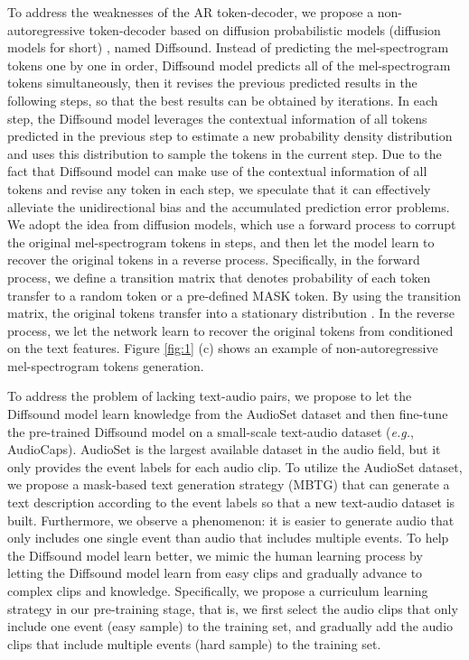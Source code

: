 \documentclass[lettersize,journal]{IEEEtran}
\begin{document}
To address the weaknesses of the AR token-decoder, we propose a non-autoregressive token-decoder based on diffusion probabilistic models (diffusion models for short) \cite{ho2020denoising,sohl2015deep,austin2021structured,gu2021vector}, named Diffsound. Instead of predicting the mel-spectrogram tokens one by one in order, Diffsound model predicts all of the mel-spectrogram tokens simultaneously, then it revises the previous predicted results in the following steps, so that the best results can be obtained by iterations. In each step, the Diffsound model leverages the contextual information of all tokens predicted in the previous step to estimate a new probability density distribution and uses this distribution to sample the tokens in the current step. Due to the fact that Diffsound model can make use of the contextual information of all tokens and revise any token in each step, we speculate that it can effectively alleviate  the unidirectional bias and the accumulated prediction error problems. We adopt the idea from diffusion models, which use a forward process to corrupt the original mel-spectrogram tokens in  steps, and then let the model learn to recover the original tokens in a reverse process. Specifically, in the forward process, we define a transition matrix that denotes probability of each token transfer to a random token or a pre-defined MASK token. By using the transition matrix, the original tokens  transfer into a stationary distribution . In the reverse process, we let the network learn to recover the original tokens from  conditioned on the text features. Figure \ref{fig:1} (c) shows an example of non-autoregressive mel-spectrogram tokens generation.




{\color{black}To address the problem of lacking text-audio pairs,} we propose to let the Diffsound model learn knowledge from the AudioSet dataset \cite{gemmeke2017audio} and then fine-tune the pre-trained Diffsound model on a small-scale text-audio dataset (\textit{e.g.}, AudioCaps). AudioSet is the largest available dataset in the audio field, but it only provides the event labels for each audio clip. To utilize the AudioSet dataset, we propose a mask-based text generation strategy (MBTG) that can generate a text description according to the event labels so that a new text-audio dataset is built. Furthermore, we observe a phenomenon: it is easier to generate audio that only includes one single event than audio that includes multiple events. To help the Diffsound model learn better, we mimic the human learning process by letting the Diffsound model learn from easy {\color{black}clips} and gradually advance to complex clips and knowledge. Specifically, we propose a curriculum learning strategy in our pre-training stage, that is, we first select the {\color{black}audio clips} that only include one event (easy sample) to the training set, and gradually add the audio clips that include multiple events (hard sample) to the training set.  
\end{document}
